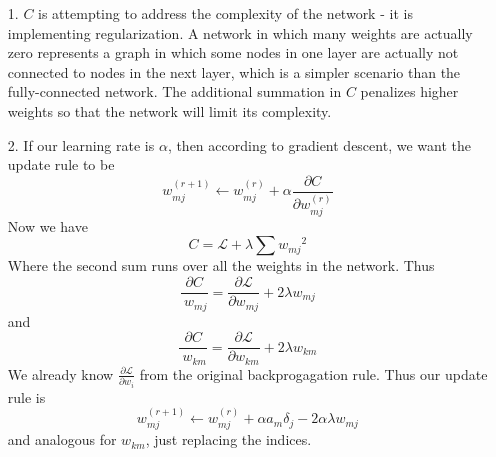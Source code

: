 \documentclass[12pt]{amsart}
\theoremstyle{remark}
\begin{document}
\begin{itemize}

\item[1.]
$C$ is attempting to address the complexity of the network - it is implementing regularization. A network in which many weights are actually zero represents a graph in which some nodes in one layer are actually not connected to nodes in the next layer, which is a simpler scenario than the fully-connected network. The additional summation in $C$ penalizes higher weights so that the network will limit its complexity.

\item[2.]
If our learning rate is $\alpha$, then according to gradient descent, we want the update rule to be 
\[
w_{mj}^{(r+1)} \leftarrow w_{mj}^{(r)} + \alpha \frac{\partial C}{\partial w_{mj}^{(r)}}
\]
Now we have
\[
C=\mathcal{L}+\lambda \sum {w_{mj}}^2
\]
Where the second sum runs over all the weights in the network.
Thus
\[
\frac{\partial C}{\ w_{mj}} = \frac{\partial \mathcal{L}}{\partial w_{mj}}+2\lambda w_{mj}
\]
and 
\[
\frac{\partial C}{\ w_{km}} = \frac{\partial \mathcal{L}}{\partial w_{km}}+2\lambda w_{km}
\]
We already know $\frac{\partial \mathcal{L}}{\partial w_i}$ from the original backprogagation rule. Thus our update rule is
\[
w_{mj}^{(r+1)} \leftarrow w_{mj}^{(r)}+\alpha a_{m}\delta_j-2\alpha\lambda w_{mj}
\]
and analogous for $w_{km}$, just replacing the indices. 
\end{itemize}
\end{document}
